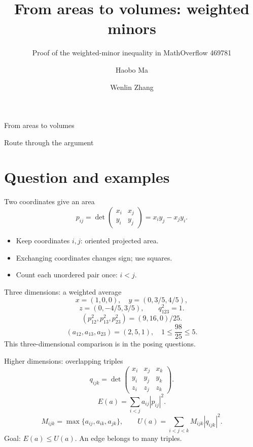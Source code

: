\documentclass{beamer}
\title{From areas to volumes: weighted minors}
\subtitle{Proof of the weighted-minor inequality in MathOverflow 469781}
\author{Haobo Ma \and Wenlin Zhang}
\begin{document}
\begin{frame}{From areas to volumes}
\titlepage
{}
\end{frame}
\begin{frame}{Route through the argument}
\tableofcontents
{}
\end{frame}
\section{Question and examples}
\begin{frame}{Two coordinates give an area}
\[
p_{ij}=\det\begin{pmatrix}x_i&x_j\\y_i&y_j\end{pmatrix}
=x_i y_j-x_j y_i.
\]
\begin{itemize}
\item Keep coordinates $i,j$: oriented projected area.
\item Exchanging coordinates changes sign; use squares.
\item Count each unordered pair once: $i<j$.
\end{itemize}
\end{frame}
\begin{frame}{Three dimensions: a weighted average}
\[
x=(1,0,0),\quad y=(0,3/5,4/5),
\]
\[
z=(0,-4/5,3/5),\qquad q_{123}^2=1.
\]
\[
(p_{12}^2,p_{13}^2,p_{23}^2)=(9,16,0)/25.
\]
\[
(a_{12},a_{13},a_{23})=(2,5,1),\quad
1\le\frac{98}{25}\le5.
\]
\small This three-dimensional comparison is in the posing questions.
\end{frame}
\begin{frame}{Higher dimensions: overlapping triples}
\[
q_{ijk}=\det\begin{pmatrix}x_i&x_j&x_k\\y_i&y_j&y_k\\z_i&z_j&z_k\end{pmatrix}.
\]
\[
E(a)=\sum_{i<j}a_{ij}|p_{ij}|^2.
\]
\[
M_{ijk}=\max\{a_{ij},a_{ik},a_{jk}\},
\qquad U(a)=\sum_{i<j<k}M_{ijk}|q_{ijk}|^2.
\]
Goal: $E(a)\le U(a)$. An edge belongs to many triples.
\end{frame}
\end{document}

